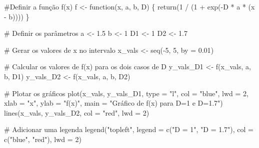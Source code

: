 \documentclass[
  letterpaper,
  DIV=11,
  numbers=noendperiod]{scrreprt}
\newenvironment{Shaded}{\begin{snugshade}}{\end{snugshade}}
\newcommand{\AttributeTok}[1]{\textcolor[rgb]{0.40,0.45,0.13}{#1}}
\newcommand{\CommentTok}[1]{\textcolor[rgb]{0.37,0.37,0.37}{#1}}
\newcommand{\ControlFlowTok}[1]{\textcolor[rgb]{0.00,0.23,0.31}{#1}}
\newcommand{\DecValTok}[1]{\textcolor[rgb]{0.68,0.00,0.00}{#1}}
\newcommand{\FloatTok}[1]{\textcolor[rgb]{0.68,0.00,0.00}{#1}}
\newcommand{\FunctionTok}[1]{\textcolor[rgb]{0.28,0.35,0.67}{#1}}
\newcommand{\NormalTok}[1]{\textcolor[rgb]{0.00,0.23,0.31}{#1}}
\newcommand{\OtherTok}[1]{\textcolor[rgb]{0.00,0.23,0.31}{#1}}
\newcommand{\SpecialCharTok}[1]{\textcolor[rgb]{0.37,0.37,0.37}{#1}}
\newcommand{\StringTok}[1]{\textcolor[rgb]{0.13,0.47,0.30}{#1}}
\begin{document}
\begin{Shaded}
\begin{Highlighting}[]
 \CommentTok{\#Definir a função f(x)}
\NormalTok{f }\OtherTok{\textless{}{-}} \ControlFlowTok{function}\NormalTok{(x, a, b, D) \{}
  \FunctionTok{return}\NormalTok{(}\DecValTok{1} \SpecialCharTok{/}\NormalTok{ (}\DecValTok{1} \SpecialCharTok{+} \FunctionTok{exp}\NormalTok{(}\SpecialCharTok{{-}}\NormalTok{D }\SpecialCharTok{*}\NormalTok{ a }\SpecialCharTok{*}\NormalTok{ (x }\SpecialCharTok{{-}}\NormalTok{ b))))}
\NormalTok{\}}

\CommentTok{\# Definir os parâmetros}
\NormalTok{a }\OtherTok{\textless{}{-}} \FloatTok{1.5}
\NormalTok{b }\OtherTok{\textless{}{-}} \DecValTok{1}
\NormalTok{D1 }\OtherTok{\textless{}{-}} \DecValTok{1}
\NormalTok{D2 }\OtherTok{\textless{}{-}} \FloatTok{1.7}

\CommentTok{\# Gerar os valores de x no intervalo}
\NormalTok{x\_vals }\OtherTok{\textless{}{-}} \FunctionTok{seq}\NormalTok{(}\SpecialCharTok{{-}}\DecValTok{5}\NormalTok{, }\DecValTok{5}\NormalTok{, }\AttributeTok{by =} \FloatTok{0.01}\NormalTok{)}

\CommentTok{\# Calcular os valores de f(x) para os dois casos de D}
\NormalTok{y\_vals\_D1 }\OtherTok{\textless{}{-}} \FunctionTok{f}\NormalTok{(x\_vals, a, b, D1)}
\NormalTok{y\_vals\_D2 }\OtherTok{\textless{}{-}} \FunctionTok{f}\NormalTok{(x\_vals, a, b, D2)}

\CommentTok{\# Plotar os gráficos}
\FunctionTok{plot}\NormalTok{(x\_vals, y\_vals\_D1, }\AttributeTok{type =} \StringTok{"l"}\NormalTok{, }\AttributeTok{col =} \StringTok{"blue"}\NormalTok{, }\AttributeTok{lwd =} \DecValTok{2}\NormalTok{, }
     \AttributeTok{xlab =} \StringTok{"x"}\NormalTok{, }\AttributeTok{ylab =} \StringTok{"f(x)"}\NormalTok{, }\AttributeTok{main =} \StringTok{"Gráfico de f(x) para D=1 e D=1.7"}\NormalTok{)}
\FunctionTok{lines}\NormalTok{(x\_vals, y\_vals\_D2, }\AttributeTok{col =} \StringTok{"red"}\NormalTok{, }\AttributeTok{lwd =} \DecValTok{2}\NormalTok{)}

\CommentTok{\# Adicionar uma legenda}
\FunctionTok{legend}\NormalTok{(}\StringTok{"topleft"}\NormalTok{, }\AttributeTok{legend =} \FunctionTok{c}\NormalTok{(}\StringTok{"D = 1"}\NormalTok{, }\StringTok{"D = 1.7"}\NormalTok{), }\AttributeTok{col =} \FunctionTok{c}\NormalTok{(}\StringTok{"blue"}\NormalTok{, }\StringTok{"red"}\NormalTok{), }\AttributeTok{lwd =} \DecValTok{2}\NormalTok{)}
\end{Highlighting}
\end{Shaded}
\end{document}
